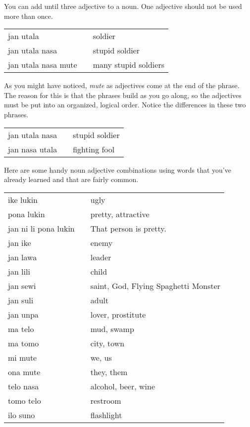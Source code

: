 You can add until three adjective to a noun. 
One adjective should not be used more than once.

\begin{supertabular}{p{5,5cm}|ll}
jan utala && soldier  \\
jan utala nasa && stupid soldier  \\
jan utala nasa mute && many stupid soldiers  \\
\end{supertabular} 

As you might have noticed, \textit{mute} as adjectives come at the end of the phrase. 
The reason for this is that the phrases build as you go along, so the adjectives must be put into an organized, logical order. 
Notice the differences in these two phrases.

\begin{supertabular}{p{5,5cm}|ll}
jan utala nasa && stupid soldier  \\
jan nasa utala && fighting fool \\
\end{supertabular}

Here are some handy noun adjective combinations using words that you've already learned and that are fairly common.

\begin{supertabular}{p{5,5cm}|ll}
ike lukin && ugly  \\
pona lukin && pretty, attractive \\
jan ni li pona lukin && That person is pretty. \\
jan ike && enemy \\
jan lawa && leader \\
jan lili && child \\
jan sewi && saint, God, Flying Spaghetti Monster \\
jan suli && adult \\
jan unpa && lover, prostitute \\
ma telo && mud, swamp \\
ma tomo && city, town \\
mi mute && we, us \\
ona mute && they, them \\
telo nasa && alcohol, beer, wine \\
tomo telo && restroom \\
ilo suno && flashlight \\ 
\end{supertabular} 

